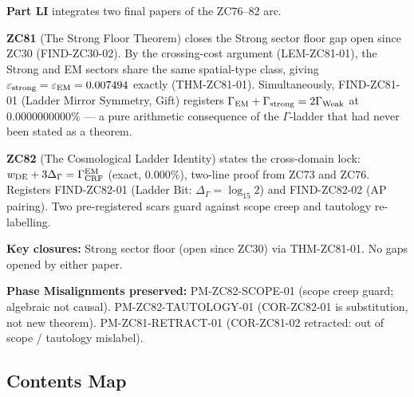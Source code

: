 \documentclass[12pt, a4paper]{article}
\begin{document}
\begin{volumebox}[title={Part LI --- ZC81--82: Strong Floor Theorem
  and Cosmological Ladder Identity (v17.13)}]
\sloppy
\textbf{Part LI} integrates two final papers of the ZC76--82 arc.

\textbf{ZC81} (The Strong Floor Theorem) closes the Strong sector
floor gap open since ZC30 (FIND-ZC30-02). By the crossing-cost
argument (LEM-ZC81-01), the Strong and EM sectors share the same
spatial-type class, giving $\varepsilon_{\rm strong} = \varepsilon_{\rm EM}
= 0.007494$ exactly (THM-ZC81-01). Simultaneously,
FIND-ZC81-01 (Ladder Mirror Symmetry, Gift)
registers $\Gamma_{\rm EM} + \Gamma_{\rm strong} = 2\Gamma_{\rm Weak}$
at $0.0000000000\%$ --- a pure arithmetic consequence of the
$\Gamma$-ladder that had never been stated as a theorem.

\textbf{ZC82} (The Cosmological Ladder Identity) states the
cross-domain lock:
$w_{\rm DE} + 3\Delta_\Gamma = \Gamma_{\rm CRF}^{\rm EM}$ (exact,
0.000\%), two-line proof from ZC73 and ZC76. Registers
FIND-ZC82-01 (Ladder Bit: $\Delta_\Gamma = \log_{15}2$) and
FIND-ZC82-02 (AP pairing). Two pre-registered scars guard against
scope creep and tautology re-labelling.

\textbf{Key closures:}
Strong sector floor (open since ZC30) via THM-ZC81-01.
No gaps opened by either paper.

\textbf{Phase Misalignments preserved:}
PM-ZC82-SCOPE-01 (scope creep guard; algebraic not causal).
PM-ZC82-TAUTOLOGY-01 (COR-ZC82-01 is substitution, not new theorem).
PM-ZC81-RETRACT-01 (COR-ZC81-02 retracted: out of scope / tautology mislabel).
\end{volumebox}

\subsection*{Contents Map}
\end{document}
